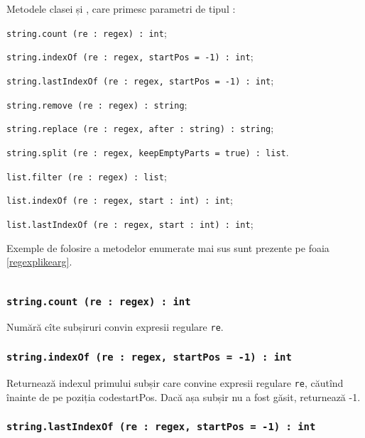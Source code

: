 Metodele clasei \str{} și \listtype, care primesc parametri de tipul \regex{}:
\begin{icItems}
\item
\texttt{string.count (re : regex) : int};
\item
\texttt{string.indexOf (re : regex, startPos = -1) : int};
\item
\texttt{string.lastIndexOf (re : regex, startPos = -1) : int};
\item
\texttt{string.remove (re : regex) : string};
\item 
\texttt{string.replace (re : regex, after : string) : string};
\item
\texttt{string.split (re : regex, keepEmptyParts = true) : list}.
\item
\texttt{list.filter (re : regex) : list};
\item
\texttt{list.indexOf (re : regex, start : int) : int};
\item
\texttt{list.lastIndexOf (re : regex, start : int) : int};
\end{icItems}

Exemple de folosire a metodelor enumerate mai sus sunt prezente pe foaia \ref{regexplikearg}.

\begin{sourcecode}
\label{regexplikearg}
\inputminted[linenos]{icl}{../sources/regexplikearg.icL}
\end{sourcecode}

\subsubsection{\texttt{string.count (re : regex) : int}}

Numără cîte subșiruri convin expresii regulare \texttt{re}.

\subsubsection{\texttt{string.indexOf (re : regex, startPos = -1) : int}}

Returnează indexul primului subșir care convine expresii regulare \texttt{re}, căutînd înainte de pe poziția code{startPos}. Dacă așa subșir nu a fost găsit, returnează -1.

\subsubsection{\texttt{string.lastIndexOf (re : regex, startPos = -1) : int}}

